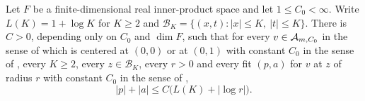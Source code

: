 \begin{lemma}
Let $F$ be a finite-dimensional real inner-product space and let
$1\le C_0<\infty$. Write $L(K)=1+\log K$ for $K\ge2$ and
$\mathcal B_K=\{(x,t):|x|\le K,\ |t|\le K\}$. There is $C>0$, depending only on
$C_0$ and $\dim F$, such that for every $v\in\mathcal{A}_{m,C_0}$ in the sense of
 which is centered at $(0,0)$ or at $(0,1)$ with constant
$C_0$ in the sense of , every $K\ge2$, every
$z\in\mathcal B_K$, every $r>0$ and every fit $(p,a)$ for $v$ at $z$ of radius
$r$ with constant $C_0$ in the sense of ,
\begin{equation}\label{eq:fit-parameter-bound}
  |p|+|a|\le C\bigl(L(K)+|\log r|\bigr).
\end{equation}
\end{lemma}
